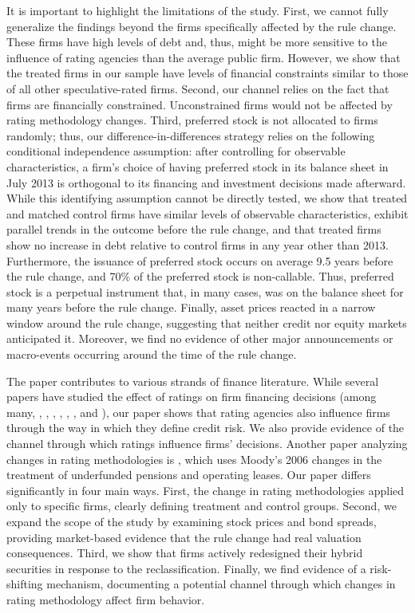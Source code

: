 \documentclass[a4paper, 12pt]{article}
\begin{document}
It is important to highlight the limitations of the study. First, we cannot fully generalize the findings beyond the firms specifically affected by the rule change. These firms have high levels of debt and, thus, might be more sensitive to the influence of rating agencies than the average public firm. However, we show that the treated firms in our sample have levels of financial constraints similar to those of all other speculative-rated firms. Second, our channel relies on the fact that firms are financially constrained. Unconstrained firms would not be affected by rating methodology changes. Third, preferred stock is not allocated to firms randomly; thus, our difference-in-differences strategy relies on the following conditional independence assumption: after controlling for observable characteristics, a firm's choice of having preferred stock in its balance sheet in July 2013 is orthogonal to its financing and investment decisions made afterward. While this identifying assumption cannot be directly tested, we show that treated and matched control firms have similar levels of observable characteristics, exhibit parallel trends in the outcome before the rule change, and that treated firms show no increase in debt relative to control firms in any year other than 2013. Furthermore, the issuance of preferred stock occurs on average 9.5 years before the rule change, and 70\% of the preferred stock is non-callable. Thus, preferred stock is a perpetual instrument that, in many cases, was on the balance sheet for many years before the rule change. Finally, asset prices reacted in a narrow window around the rule change, suggesting that neither credit nor equity markets anticipated it. Moreover, we find no evidence of other major announcements or macro-events occurring around the time of the rule change.

The paper contributes to various strands of finance literature. While several papers have studied the effect of ratings on firm financing decisions (among many, \citealp{graham2001theory}, \citealp{kisgen2006credit}, \citealp{sufi2007real}, \citealp{kisgen2009firms}, \citealp{hovakimian2009credit}, \citealp{begley2013real}, \citealp{adelino2017economic} and \citealp{almeida2017real}), our paper shows that rating agencies also influence firms through the way in which they define credit risk. We also provide evidence of the channel through which ratings influence firms' decisions. Another paper analyzing changes in rating methodologies is \cite{kisgen2019impact}, which uses Moody's 2006 changes in the treatment of underfunded pensions and operating leases. Our paper differs significantly in four main ways. First, the change in rating methodologies applied only to specific firms, clearly defining treatment and control groups. Second, we expand the scope of the study by examining stock prices and bond spreads, providing market-based evidence that the rule change had real valuation consequences. Third, we show that firms actively redesigned their hybrid securities in response to the reclassification. Finally, we find evidence of a risk-shifting mechanism, documenting a potential channel through which changes in rating methodology affect firm behavior.
\end{document}
